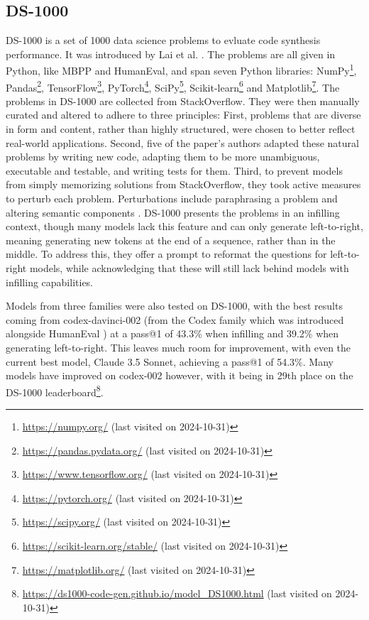 \subsection{DS-1000}
\label{sec:ds1000}
DS-1000 is a set of 1000 data science problems to evluate code synthesis performance.
It was introduced by Lai et al. \cite{Lai.2023}.
The problems are all given in Python, like MBPP and HumanEval, and span seven Python libraries: NumPy\footnote{\url{https://numpy.org/} (last visited on 2024-10-31)}, Pandas\footnote{\url{https://pandas.pydata.org/} (last visited on 2024-10-31)}, TensorFlow\footnote{\url{https://www.tensorflow.org/} (last visited on 2024-10-31)}, PyTorch\footnote{\url{https://pytorch.org/} (last visited on 2024-10-31)},
SciPy\footnote{\url{https://scipy.org/} (last visited on 2024-10-31)}, Scikit-learn\footnote{\url{https://scikit-learn.org/stable/} (last visited on 2024-10-31)} and Matplotlib\footnote{\url{https://matplotlib.org/} (last visited on 2024-10-31)}.
The problems in DS-1000 are collected from StackOverflow.
They were then manually curated and altered to adhere to three principles:
First, problems that are diverse in form and content, rather than highly structured, were chosen to better reflect real-world applications.
Second, five of the paper's authors adapted these natural problems by writing new code, adapting them to be more unambiguous, executable and testable, and writing tests for them.
Third, to prevent models from simply memorizing solutions from StackOverflow, they took active measures to perturb each problem.
Perturbations include paraphrasing a problem and altering semantic components \cite{Lai.2023}.
DS-1000 presents the problems in an infilling context, though many models lack this feature and can only generate left-to-right, meaning generating new tokens at the end of a sequence, rather than in the middle.
To address this, they offer a prompt to reformat the questions for left-to-right models, while acknowledging that these will still lack behind models with infilling capabilities.

Models from three families were also tested on DS-1000, with the best results coming from codex-davinci-002 (from the Codex family which was introduced alongside HumanEval \cite{Chen.2021}) at a pass@1 of 43.3\% when infilling and 39.2\% when generating left-to-right.
This leaves much room for improvement, with even the current best model, Claude 3.5 Sonnet, achieving a pass@1 of 54.3\%.
Many models have improved on codex-002 however, with it being in 29th place on the DS-1000 leaderboard\footnote{\url{https://ds1000-code-gen.github.io/model_DS1000.html} (last visited on 2024-10-31)}.


